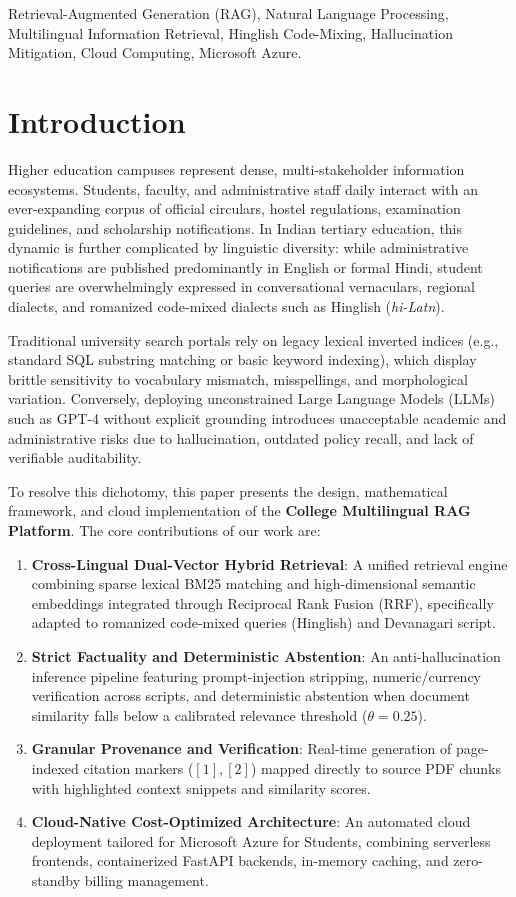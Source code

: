\documentclass[conference]{IEEEtran}
\begin{document}
\begin{IEEEkeywords}
Retrieval-Augmented Generation (RAG), Natural Language Processing, Multilingual Information Retrieval, Hinglish Code-Mixing, Hallucination Mitigation, Cloud Computing, Microsoft Azure.
\end{IEEEkeywords}

\section{Introduction}
Higher education campuses represent dense, multi-stakeholder information ecosystems. Students, faculty, and administrative staff daily interact with an ever-expanding corpus of official circulars, hostel regulations, examination guidelines, and scholarship notifications. In Indian tertiary education, this dynamic is further complicated by linguistic diversity: while administrative notifications are published predominantly in English or formal Hindi, student queries are overwhelmingly expressed in conversational vernaculars, regional dialects, and romanized code-mixed dialects such as Hinglish (\textit{hi-Latn}).

Traditional university search portals rely on legacy lexical inverted indices (e.g., standard SQL substring matching or basic keyword indexing), which display brittle sensitivity to vocabulary mismatch, misspellings, and morphological variation. Conversely, deploying unconstrained Large Language Models (LLMs) such as GPT-4 without explicit grounding introduces unacceptable academic and administrative risks due to hallucination, outdated policy recall, and lack of verifiable auditability.

To resolve this dichotomy, this paper presents the design, mathematical framework, and cloud implementation of the \textbf{College Multilingual RAG Platform}. The core contributions of our work are:
\begin{enumerate}
    \item \textbf{Cross-Lingual Dual-Vector Hybrid Retrieval}: A unified retrieval engine combining sparse lexical BM25 matching and high-dimensional semantic embeddings integrated through Reciprocal Rank Fusion (RRF), specifically adapted to romanized code-mixed queries (Hinglish) and Devanagari script.
    \item \textbf{Strict Factuality and Deterministic Abstention}: An anti-hallucination inference pipeline featuring prompt-injection stripping, numeric/currency verification across scripts, and deterministic abstention when document similarity falls below a calibrated relevance threshold ($\theta = 0.25$).
    \item \textbf{Granular Provenance and Verification}: Real-time generation of page-indexed citation markers ($[1], [2]$) mapped directly to source PDF chunks with highlighted context snippets and similarity scores.
    \item \textbf{Cloud-Native Cost-Optimized Architecture}: An automated cloud deployment tailored for Microsoft Azure for Students, combining serverless frontends, containerized FastAPI backends, in-memory caching, and zero-standby billing management.
\end{enumerate}
\end{document}
